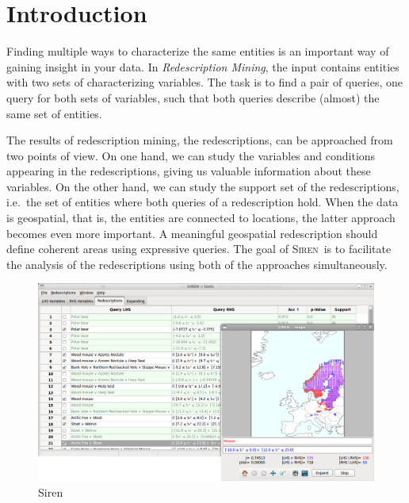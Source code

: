 \documentclass{sig-alternate}
\newcommand{\note}[1]{{\color{red}#1}}
\newcommand{\Siren}{\textsc{Siren}}
\begin{document}

\section{Introduction}
Finding multiple ways to characterize the same entities is an
important way of gaining insight in your data.  
In \emph{Redescription
Mining}, the input contains entities with two sets of characterizing
variables. The task is to find a pair of queries, one query for both
sets of variables, such that both queries describe (almost) the same
set of entities.

The results of redescription mining, the redescriptions, can be
approached from two points of view. On one hand, we can study the
variables and conditions appearing in the redescriptions, giving us
valuable information about these variables. On the other hand, we can
study the support set of the redescriptions, i.e.\ the set of
entities where both queries of a redescription hold. When the data
is geospatial, that is, the entities are connected to locations, the
latter approach becomes even more important. A meaningful geospatial
redescription should define coherent areas using expressive
queries. The goal of \Siren\ is to facilitate the analysis of the
redescriptions using both of the approaches simultaneously.


\begin{figure}[t]
  \centering
\includegraphics[width=\textwidth]{screenshots/both_panels_02.png}
  \caption{Siren}
  \label{fig:both_panels}
\end{figure}
\end{document}
